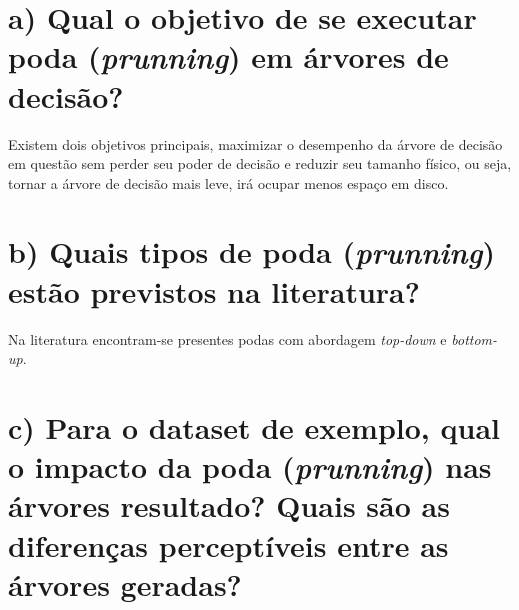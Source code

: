 \documentclass[
    article,            %
    11pt,               %
    oneside,            %
    a4paper,            %
    english,            %
    brazil,             %
    sumario=tradicional,
    ]{abntex2}
\begin{document}
\section*{\textbf{a) Qual o objetivo de se executar poda (\textit{prunning}) em árvores de decisão?}}

Existem dois objetivos principais, maximizar o desempenho da árvore de decisão em questão sem perder seu poder de decisão e reduzir seu tamanho físico, ou seja, tornar a árvore de decisão mais leve, irá ocupar menos espaço em disco.

\section*{\textbf{b) Quais tipos de poda (\textit{prunning}) estão previstos na literatura?}}

Na literatura encontram-se presentes podas com abordagem \textit{top-down} e \textit{bottom-up}.  

\section*{\textbf{c) Para o dataset de exemplo, qual o impacto da poda (\textit{prunning}) nas árvores resultado? Quais são as diferenças perceptíveis entre as árvores geradas?}}


% 


\postextual

\newpage
\nocite{material_aula}
\nocite{enunciado_aula}
\nocite{Witten:2016:DMF:3086818}

\end{document}
